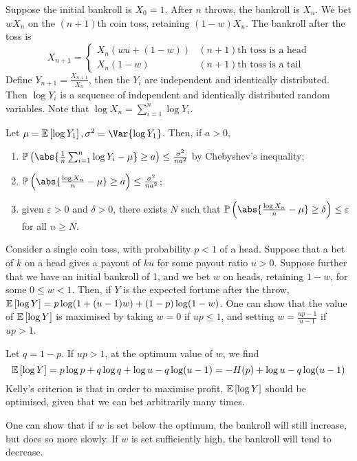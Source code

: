 Suppose the initial bankroll is $X_0 = 1$.
After $n$ throws, the bankroll is $X_n$.
We bet $w X_n$ on the $(n + 1)$th coin toss, retaining $(1-w)X_n$.
The bankroll after the toss is
\[ X_{n+1} = \begin{cases}
    X_n(wu + (1-w)) & (n + 1)\text{th toss is a head} \\
    X_n(1-w) & (n + 1)\text{th toss is a tail}
\end{cases} \]
Define $Y_{n+1} = \frac{X_{n+1}}{X_n}$, then the $Y_i$ are independent and identically distributed.
Then $\log Y_i$ is a sequence of independent and identically distributed random variables.
Note that $\log X_n = \sum_{i=1}^n \log Y_i$.
\begin{lemma}
    Let $\mu = \expect{\log Y_1}, \sigma^2 = \Var{\log Y_1}$.
    Then, if $a > 0$,
    \begin{enumerate}
        \item $\prob{\abs{\frac{1}{n} \sum_{i=1}^n \log Y_i - \mu} \geq a} \leq \frac{\sigma^2}{na^2}$ by Chebyshev's inequality;
        \item $\prob{\abs{\frac{\log X_n}{n} - \mu} \geq a} \leq \frac{\sigma^2}{na^2}$;
        \item given $\varepsilon > 0$ and $\delta > 0$, there exists $N$ such that $\prob{\abs{\frac{\log X_n}{n} - \mu} \geq \delta} \leq \varepsilon$ for all $n \geq N$.
    \end{enumerate}
\end{lemma}
Consider a single coin toss, with probability $p < 1$ of a head.
Suppose that a bet of $k$ on a head gives a payout of $ku$ for some payout ratio $u > 0$.
Suppose further that we have an initial bankroll of 1, and we bet $w$ on heads, retaining $1 - w$, for some $0 \leq w < 1$.
Then, if $Y$ is the expected fortune after the throw, $\mathbb{E}\left[{\log Y}\right] = p \log(1 + (u-1)w) + (1-p) \log(1-w)$.
One can show that the value of $\mathbb{E}\left[{\log Y}\right]$ is maximised by taking $w = 0$ if $up \leq 1$, and setting $w = \frac{up-1}{u-1}$ if $up > 1$.

Let $q = 1-p$.
If $up > 1$, at the optimum value of $w$, we find
\[ \mathbb{E}\left[{\log Y}\right] = p \log p + q \log q + \log u - q \log(u-1) = -H(p) + \log u - q \log(u-1) \]
Kelly's criterion is that in order to maximise profit, $\mathbb{E}\left[{\log Y}\right]$ should be optimised, given that we can bet arbitrarily many times.

One can show that if $w$ is set below the optimum, the bankroll will still increase, but does so more slowly.
If $w$ is set sufficiently high, the bankroll will tend to decrease.
